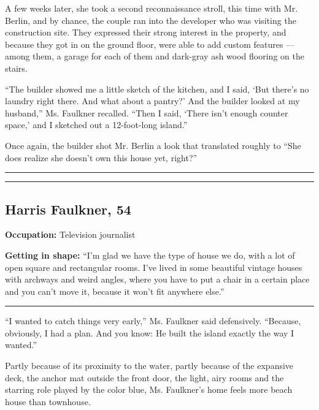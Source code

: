 A few weeks later, she took a second reconnaissance stroll, this time
with Mr. Berlin, and by chance, the couple ran into the developer who
was visiting the construction site. They expressed their strong interest
in the property, and because they got in on the ground floor, were able
to add custom features --- among them, a garage for each of them and
dark-gray ash wood flooring on the stairs.

``The builder showed me a little sketch of the kitchen, and I said, `But
there's no laundry right there. And what about a pantry?' And the
builder looked at my husband,'' Ms. Faulkner recalled. ``Then I said,
`There isn't enough counter space,' and I sketched out a 12-foot-long
island.''

Once again, the builder shot Mr. Berlin a look that translated roughly
to ``She does realize she doesn't own this house yet, right?''

\begin{center}\rule{0.5\linewidth}{\linethickness}\end{center}

\begin{center}\rule{0.5\linewidth}{\linethickness}\end{center}

\hypertarget{harris-faulkner-54}{%
\subsection{Harris Faulkner, 54}\label{harris-faulkner-54}}

\textbf{Occupation:} Television journalist

\textbf{Getting in shape:} ``I'm glad we have the type of house we do,
with a lot of open square and rectangular rooms. I've lived in some
beautiful vintage houses with archways and weird angles, where you have
to put a chair in a certain place and you can't move it, because it
won't fit anywhere else.''

\begin{center}\rule{0.5\linewidth}{\linethickness}\end{center}

``I wanted to catch things very early,'' Ms. Faulkner said defensively.
``Because, obviously, I had a plan. And you know: He built the island
exactly the way I wanted.''

Partly because of its proximity to the water, partly because of the
expansive deck, the anchor mat outside the front door, the light, airy
rooms and the starring role played by the color blue, Ms. Faulkner's
home feels more beach house than townhouse.

